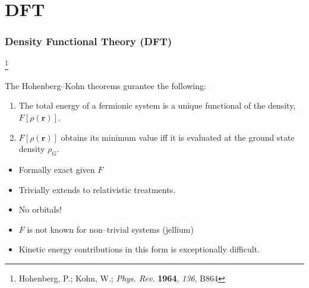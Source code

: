 \documentclass{beamer}
\newcommand\blfootnote[1]{%
  \begingroup
  \renewcommand\thefootnote{}\footnote{#1}%
  \addtocounter{footnote}{-1}%
  \endgroup
}
\begin{document}
\section{DFT}

\begin{frame}
\frametitle{Density Functional Theory (DFT)}
\blfootnote{Hohenberg, P.; Kohn, W.; \emph{Phys. Rev.} \textbf{1964}, \emph{136}, B864}

The Hohenberg--Kohn theorems gurantee the following:
\begin{enumerate}
  \item The total energy of a fermionic system is a unique functional of the density, $F[\rho(\mathbf{r})]$.
  \item $F[\rho(\mathbf{r})]$ obtains its minimum value iff it is evaluated at the ground state density $\rho_G$.
\end{enumerate}

\begin{itemize}
  \color{green}
  \item Formally exact given $F$
  \item Trivially extends to relativistic treatments.
  \item No orbitals!
\end{itemize}

\begin{itemize}
  \color{red}
  \item $F$ is not known for non--trivial systems (jellium)
  \item Kinetic energy contributions in this form is exceptionally difficult.
\end{itemize}

\end{frame}
\end{document}
